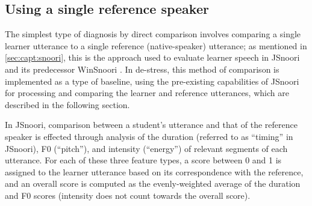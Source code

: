 	
	\subsection{Using a single reference speaker}
	\label{sec:compare:single}
	
	
	The simplest type of diagnosis by direct comparison involves comparing a single learner utterance to a single reference (native-speaker) utterance; as mentioned in \cref{sec:capt:snoori}, this is the approach used to evaluate learner speech in JSnoori and its predecessor WinSnoori \citep{Bonneau2004,Henry2007,Bonneau2011}. 
	In de-stress, this method of comparison is implemented as a type of baseline, using the pre-existing capabilities of JSnoori for processing and comparing the learner and reference utterances, which are described in the following section. 
	
	
	In JSnoori, comparison between a student's utterance and that of the reference speaker is effected through analysis of the duration (referred to as ``timing'' in JSnoori), F0 (``pitch''), and intensity (``energy'') of relevant segments of each utterance. 
	For each of these three feature types, a score between 0 and 1 is assigned to the learner utterance based on its correspondence with the reference, and an overall score is computed as the evenly-weighted average of the duration and F0 scores (intensity does not count towards the overall score). 
	
	
